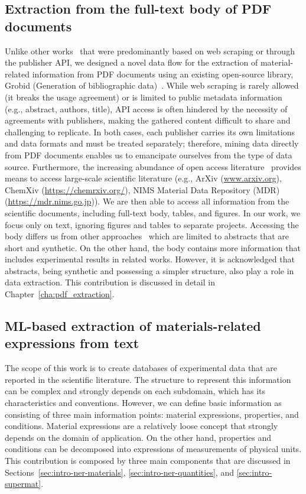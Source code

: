 \subsection{Extraction from the full-text body of PDF documents}
\label{sec:intro-pdf-contribution}

Unlike other works~\cite{court2018auto, court2020magnetic, kononova2019text} that were predominantly based on web scraping or through the publisher API, we designed a novel data flow for the extraction of material-related information from PDF documents using an existing open-source library, Grobid (Generation of bibliographic data)~\cite{Grobid}. 
While web scraping is rarely allowed (it breaks the usage agreement) or is limited to public metadata information (e.g., abstract, authors, title), API access is often hindered by the necessity of agreements with publishers, making the gathered content difficult to share and challenging to replicate.
In both cases, each publisher carries its own limitations and data formats and must be treated separately; therefore, mining data directly from PDF documents enables us to emancipate ourselves from the type of data source.
Furthermore, the increasing abundance of open access literature~\cite{laakso2011the} provides means to access large-scale scientific literature (e.g., ArXiv (\url{www.arxiv.org}), ChemXiv (\url{https://chemrxiv.org/}), NIMS Material Data Repository (MDR)~\cite{tanifuji2019mdr} (\url{https://mdr.nims.go.jp})). 
We are then able to access all information from the scientific documents, including full-text body, tables, and figures. In our work, we focus only on text, ignoring figures and tables to separate projects. 
Accessing the body differs us from other approaches~\cite{yamaguchi-etal-2020-sc} which are limited to abstracts that are short and synthetic. On the other hand, the body contains more information that includes experimental results in related works. 
However, it is acknowledged that abstracts, being synthetic and possessing a simpler structure, also play a role in data extraction.
This contribution is discussed in detail in Chapter~\ref{cha:pdf_extraction}.

\subsection{ML-based extraction of materials-related expressions from text}
\label{sec:intro-material-related-extraction}

The scope of this work is to create databases of experimental data that are reported in the scientific literature. 
The structure to represent this information can be complex and strongly depends on each subdomain, which has its characteristics and conventions. 
However, we can define basic information as consisting of three main information points: material expressions, properties, and conditions. 
Material expressions are a relatively loose concept that strongly depends on the domain of application. On the other hand, properties and conditions can be decomposed into expressions of measurements of physical units. 
This contribution is composed by three main components that are discussed in Sections~\ref{sec:intro-ner-materials}, \ref{sec:intro-ner-quantities}, and \ref{sec:intro-supermat}.

